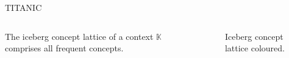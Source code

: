 \begin{frame}{TITANIC~\parencite{titanic_2002}}
\begin{columns}
    \begin{column}{0.7\textwidth}
        \begin{definition}
        The iceberg concept lattice of a context $\mathbb{K}$ comprises all frequent concepts.
        \end{definition}

    \end{column}
    \begin{column}{0.25\textwidth}
    \begin{figure}[htbp]
        \centering
        \resizebox{\textwidth}{!}{\FormalConceptGraphColoured}
        \caption{Iceberg concept lattice coloured.}
        \label{fig:titanic_formal_concept_graph_coloured}
    \end{figure}
    \end{column}
\end{columns}
\end{frame}